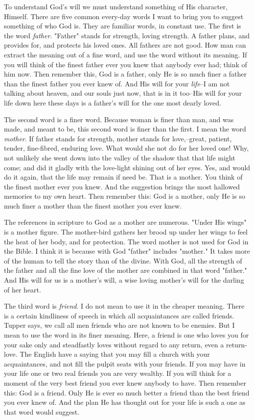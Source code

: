 To understand God's will we must understand something of His character,
Himself. There are five common every-day words I want to bring you to
suggest something of who God is. They are familiar words, in constant use.
The first is the word \textit{father}. "Father" stands for strength, loving
strength. A father plans, and provides for, and protects his loved ones.
All fathers are not good. How man can extract the meaning out of a fine
word, and use the word without its meaning. If you will think of the
finest father ever you knew that anybody ever had; think of him now. Then
remember this, God is a father, only He is so much finer a father than the
finest father you ever knew of. And His will for your \textit{life}--I am not
talking about heaven, and our souls just now, that is in it too--His will
for your life down here these days is a father's will for the one most
dearly loved.

The second word is a finer word. Because woman is finer than man, and was
made, and meant to be, this second word is finer than the first. I mean
the word \textit{mother}. If father stands for strength, mother stands for
love,--great, patient, tender, fine-fibred, enduring love. What would she
not do for her loved one! Why, not unlikely she went down into the valley
of the shadow that that life might come; and did it gladly with the
love-light shining out of her eyes. Yes, and would do it again, that the
life may remain if need be. That is a mother. You think of the finest
mother ever you knew. And the suggestion brings the most hallowed memories
to my own heart. Then remember this: God is a mother, only He is so much
finer a mother than the finest mother you ever knew.

The references in scripture to God as a mother are numerous. "Under His
wings" is a mother figure. The mother-bird gathers her brood up under her
wings to feel the heat of her body, and for protection. The word mother is
not used for God in the Bible. I think it is because with God "father"
includes "mother." It takes more of the human to tell the story than of
the divine. With God, all the strength of the father and all the fine love
of the mother are combined in that word "father." And His will for us is a
mother's will, a wise loving mother's will for the darling of her heart.

The third word is \textit{friend}. I do not mean to use it in the cheaper
meaning. There is a certain kindliness of speech in which all
acquaintances are called friends. Tupper says, we call all men friends who
are not known to be enemies. But I mean to use the word in its finer
meaning. Here, a friend is one who loves you for your sake only and
steadfastly loves without regard to any return, even a return-love. The
English have a saying that you may fill a church with your acquaintances,
and not fill the pulpit seats with your friends. If you may have in your
life one or two real friends you are very wealthy. If you will think for a
moment of the very best friend you ever knew anybody to have. Then
remember this: God is a friend. Only He is ever so much better a friend
than the best friend you ever knew of. And the plan He has thought out for
your life is such a one as that word would suggest.

